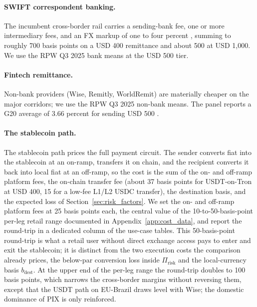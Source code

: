 \paragraph{SWIFT correspondent banking.} The incumbent cross-border rail carries a sending-bank fee, one or more intermediary fees, and an FX markup of one to four percent \citep{cpmi_2018_cross_border_retail}, summing to roughly 700 basis points on a USD 400 remittance and about 500 at USD 1{,}000. We use the RPW Q3 2025 bank means at the USD 500 tier.

\paragraph{Fintech remittance.} Non-bank providers (Wise, Remitly, WorldRemit) are materially cheaper on the major corridors; we use the RPW Q3 2025 non-bank means. The panel reports a G20 average of 3.66 percent for sending USD 500 \citep{rpw_q3_2025}.

\paragraph{The stablecoin path.} The stablecoin path prices the full payment circuit. The sender converts fiat into the stablecoin at an on-ramp, transfers it on chain, and the recipient converts it back into local fiat at an off-ramp, so the cost is the sum of the on- and off-ramp platform fees, the on-chain transfer fee (about 37 basis points for USDT-on-Tron at USD 400, 15 for a low-fee L1/L2 USDC transfer), the destination basis, and the expected loss of Section~\ref{sec:risk_factors}. We set the on- and off-ramp platform fees at 25 basis points each, the central value of the 10-to-50-basis-point per-leg retail range documented in Appendix~\ref{app:cost_data}, and report the round-trip in a dedicated column of the use-case tables. This 50-basis-point round-trip is what a retail user without direct exchange access pays to enter and exit the stablecoin; it is distinct from the two execution costs the comparison already prices, the below-par conversion loss inside $\Pi_{\text{risk}}$ and the local-currency basis $b_{\text{dest}}$. At the upper end of the per-leg range the round-trip doubles to 100 basis points, which narrows the cross-border margins without reversing them, except that the USDT path on EU-Brazil draws level with Wise; the domestic dominance of PIX is only reinforced.

